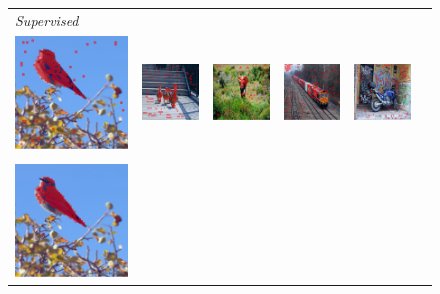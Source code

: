 \begin{figure}[t]
\centering
  \setlength{\tabcolsep}{0.8pt}
\begin{tabular}{@{}lccccc}
	\small \textit{Supervised} &&&&\\
	\includegraphics[width=.195\linewidth]{fig4-sup-857mask-head1.png}&
	\includegraphics[width=.195\linewidth]{fig4-sup-1425mask-head1.png}&
	\includegraphics[width=.195\linewidth]{fig4-sup-1339mask-head1.png}&
	\includegraphics[width=.195\linewidth]{fig4-sup-967mask-head2.png}&
	\includegraphics[width=.195\linewidth]{2963_sup.png}\\
	\small \textit{\OURS} &&&&\\
	\includegraphics[width=.195\linewidth]{fig4-dino-857mask-head2.png}&

\end{tabular}
\end{figure}
